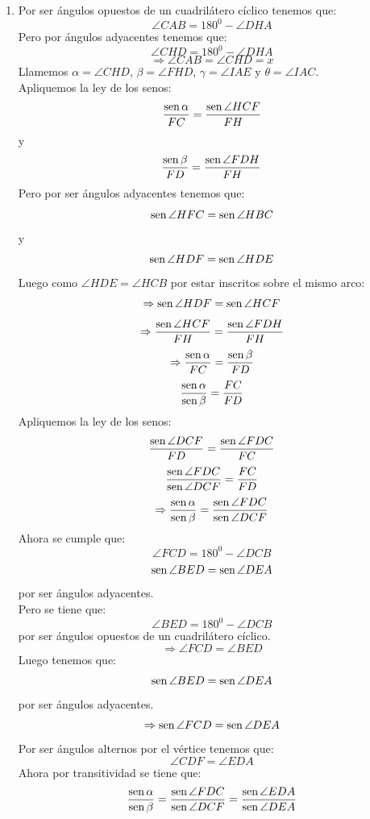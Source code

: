 \documentclass{book}
\newcommand{\sen}{\mathop{\rm sen}\nolimits} %
\begin{document}
\begin{enumerate}
\begin{enumerate}
\begin{center}
                    \end{center}
              \item Por ser ángulos opuestos de un cuadrilátero cíclico tenemos que:
                    $$\angle CAB=180^0-\angle DHA$$
                    Pero por ángulos adyacentes tenemos que:
                    $$\angle CHD=180^0-\angle DHA$$
                    $$\Rightarrow\angle CAB=\angle CHD=x$$
                    Llamemos $\alpha=\angle CHD$, $\beta=\angle FHD$, $\gamma =\angle IAE$ y $\theta=\angle IAC$.\\
                    Apliquemos la ley de los senos:
                    $${\sen \alpha\over FC}={\sen {\angle HCF}\over FH}$$
                    y
                    $${\sen \beta\over FD}={\sen {\angle FDH}\over FH}$$
                    Pero por ser ángulos adyacentes tenemos que:
                    $$\sen {\angle HFC}=\sen {\angle HBC}$$
                    y
                    $$\sen {\angle HDF}=\sen {\angle HDE}$$
                    Luego como $\angle HDE=\angle HCB$ por estar inscritos sobre el mismo arco:
                    $$\Rightarrow\sen {\angle HDF}=\sen {\angle HCF}$$
                    $$\Rightarrow{\sen {\angle HCF}\over FH}={\sen {\angle FDH}\over FH}$$
                    $$\Rightarrow{\sen \alpha\over FC}={\sen \beta\over FD}$$
                    $${\sen \alpha\over\sen \beta}={FC\over FD}$$
                    Apliquemos la ley de los senos:
                    $${\sen {\angle DCF}\over FD}={\sen {\angle FDC}\over FC}$$
                    $${\sen {\angle FDC}\over\sen {\angle DCF}}={FC\over FD}$$
                    $$\Rightarrow{\sen \alpha\over\sen \beta}={\sen {\angle FDC}\over\sen {\angle DCF}}$$
                    Ahora se cumple que:
                    $$\angle FCD=180^0-\angle DCB$$
                    $$\sen {\angle BED}=\sen {\angle DEA}$$
                    por ser ángulos adyacentes.\\
                    Pero se tiene que:
                    $$\angle BED=180^0-\angle DCB$$
                    por ser ángulos opuestos de un cuadrilátero cíclico.
                    $$\Rightarrow\angle FCD=\angle BED$$
                    Luego tenemos que:
                    $$\sen {\angle BED}=\sen {\angle DEA}$$
                    por ser ángulos adyacentes.
                    $$\Rightarrow\sen {\angle FCD}=\sen {\angle DEA}$$
                    Por ser ángulos alternos por el vértice tenemos que:
                    $$\angle CDF=\angle EDA$$
                    Ahora por transitividad se tiene que:
                    $${\sen \alpha\over\sen \beta}={\sen {\angle FDC}\over\sen {\angle DCF}}={\sen {\angle EDA}\over\sen {\angle DEA}}$$

\end{enumerate}
\end{enumerate}
\end{document}

